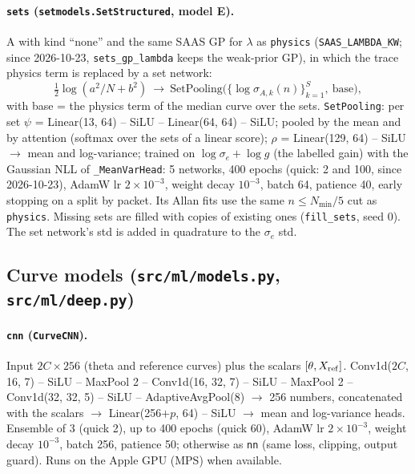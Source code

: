\documentclass[10pt]{article}
\newcommand{\code}[1]{\texttt{#1}}
\newcommand{\se}{\sigma_e}
\begin{document}
\paragraph{\code{sets} (\code{setmodels.SetStructured}, model E).} A with kind ``none'' and the same SAAS GP for $\lambda$
as \code{physics} (\code{SAAS\_LAMBDA\_KW}; since 2026-10-23, \code{sets\_gp\_lambda} keeps the weak-prior GP), in which the trace physics term is replaced by a set network:
\[ \tfrac12\log(a^2/N + b^2) \ \to\ \mathrm{SetPooling}\big(\{\log\sigma_{A,k}(n)\}_{k=1}^{S},\ \text{base}\big), \]
with base = the physics term of the median curve over the sets. \code{SetPooling}: per set $\psi$ = Linear(13, 64) --
SiLU -- Linear(64, 64) -- SiLU; pooled by the mean and by attention (softmax over the sets of a linear score); $\rho$ =
Linear(129, 64) -- SiLU $\to$ mean and log-variance; trained on $\log\se + \log g$ (the labelled gain) with the Gaussian
NLL of \code{\_MeanVarHead}: 5 networks, 400 epochs (quick: 2 and 100, since 2026-10-23), AdamW lr $2\times10^{-3}$,
weight decay $10^{-3}$, batch 64, patience 40, early stopping on a split by packet. Its Allan fits use the same
$n \le N_{\min}/5$ cut as \code{physics}. Missing sets are filled with copies of existing ones (\code{fill\_sets},
seed 0). The set network's std is added in quadrature to the $\se$ std.

\subsection{Curve models (\code{src/ml/models.py}, \code{src/ml/deep.py})}

\paragraph{\code{cnn} (\code{CurveCNN}).} Input $2C\times256$ (theta and reference curves) plus the scalars
$[\theta, X_{\rm ref}]$. Conv1d($2C$, 16, 7) -- SiLU -- MaxPool 2 -- Conv1d(16, 32, 7) -- SiLU -- MaxPool 2 --
Conv1d(32, 32, 5) -- SiLU -- AdaptiveAvgPool(8) $\to$ 256 numbers, concatenated with the scalars $\to$ Linear(256$+p$, 64)
-- SiLU $\to$ mean and log-variance heads. Ensemble of 3 (quick 2), up to 400 epochs (quick 60), AdamW lr
$2\times10^{-3}$, weight decay $10^{-3}$, batch 256, patience 50; otherwise as \code{nn} (same loss, clipping, output
guard). Runs on the Apple GPU (MPS) when available.
\end{document}
